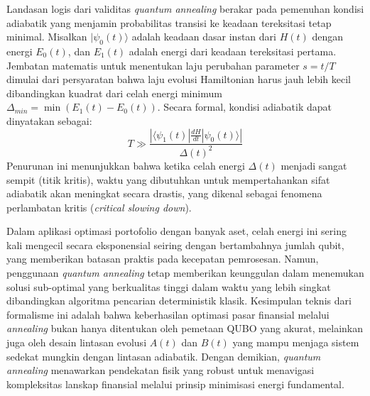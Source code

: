 Landasan logis dari validitas \textit{quantum annealing} berakar pada pemenuhan kondisi adiabatik yang menjamin probabilitas transisi ke keadaan tereksitasi tetap minimal. Misalkan $|\psi_0(t)\rangle$ adalah keadaan dasar instan dari $H(t)$ dengan energi $E_0(t)$, dan $E_1(t)$ adalah energi dari keadaan tereksitasi pertama. Jembatan matematis untuk menentukan laju perubahan parameter $s = t/T$ dimulai dari persyaratan bahwa laju evolusi Hamiltonian harus jauh lebih kecil dibandingkan kuadrat dari celah energi minimum $\Delta_{min} = \min(E_1(t) - E_0(t))$. Secara formal, kondisi adiabatik dapat dinyatakan sebagai:
\begin{equation}
    T \gg \frac{|\langle \psi_1(t) | \frac{dH}{dt} | \psi_0(t) \rangle|}{\Delta(t)^2}
\end{equation}
Penurunan ini menunjukkan bahwa ketika celah energi $\Delta(t)$ menjadi sangat sempit (titik kritis), waktu yang dibutuhkan untuk mempertahankan sifat adiabatik akan meningkat secara drastis, yang dikenal sebagai fenomena perlambatan kritis (\textit{critical slowing down}).

Dalam aplikasi optimasi portofolio dengan banyak aset, celah energi ini sering kali mengecil secara eksponensial seiring dengan bertambahnya jumlah qubit, yang memberikan batasan praktis pada kecepatan pemrosesan. Namun, penggunaan \textit{quantum annealing} tetap memberikan keunggulan dalam menemukan solusi sub-optimal yang berkualitas tinggi dalam waktu yang lebih singkat dibandingkan algoritma pencarian deterministik klasik. Kesimpulan teknis dari formalisme ini adalah bahwa keberhasilan optimasi pasar finansial melalui \textit{annealing} bukan hanya ditentukan oleh pemetaan QUBO yang akurat, melainkan juga oleh desain lintasan evolusi $A(t)$ dan $B(t)$ yang mampu menjaga sistem sedekat mungkin dengan lintasan adiabatik. Dengan demikian, \textit{quantum annealing} menawarkan pendekatan fisik yang robust untuk menavigasi kompleksitas lanskap finansial melalui prinsip minimisasi energi fundamental.

